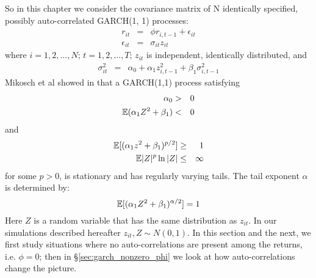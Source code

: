 \documentclass{report}
\begin{document}
So in this chapter we consider the covariance matrix of N
identically specified, possibly auto-correlated GARCH(1, 1)
processes:
\begin{eqnarray}
  r_{it} &=& \phi r_{i, t-1} + \epsilon_{it} \nonumber \\
  \epsilon_{it} &=& \sigma_{it} z_{it} \label{eq:garch_spec}
\end{eqnarray}
where $i=1,2,...,N$; $t=1,2,...,T$; $z_{it}$ is independent,
identically distributed, and
\begin{eqnarray*}
  \sigma_{it}^2 &=& \alpha_0 + \alpha_1 z_{i, t-1}^2 + \beta_1
  \sigma_{i,t-1}^2
\end{eqnarray*}
Mikosch et al showed in \cite{mikosch2000} that a GARCH(1,1) process
satisfying
\begin{eqnarray*}
  \alpha_0 &>& 0 \\
  \mathbb{E}(\alpha_1 Z^2 + \beta_1) &<& 0 \\
\end{eqnarray*}
and
\begin{eqnarray*}
  \mathbb{E}[(\alpha_1 z^2 + \beta_1)^{p/2}] &\geq& 1 \\
  \mathbb{E}|Z|^p \ln|Z| &\leq& \infty
\end{eqnarray*}
for some $p > 0$, is stationary and has regularly varying tails. The
tail exponent $\alpha$ is determined by:
\begin{equation}\label{eq:garch_alpha}
  \mathbb{E}[(\alpha_1 Z^2 + \beta_1)^{\alpha/2}] = 1
\end{equation}
Here $Z$ is a random variable that has the same distribution as
$z_{it}$. In our simulations described hereafter $z_{it}, Z \sim N(0,
1)$. In this section and the next, we first study situations where no
auto-correlations are present among the returns, i.e. $\phi = 0$; then
in \S\ref{sec:garch_nonzero_phi} we look at how auto-correlations
change the picture.
\end{document}
